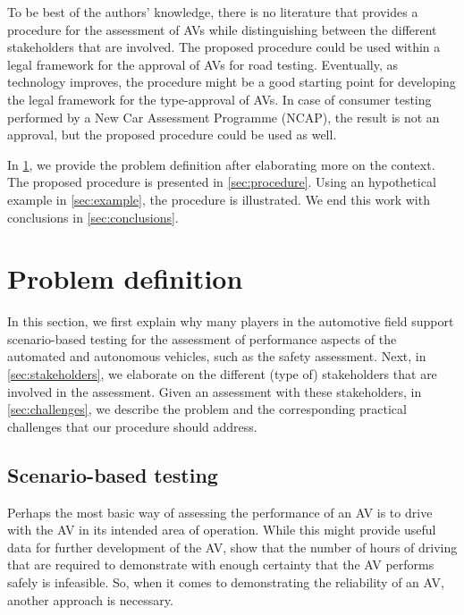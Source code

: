 \documentclass[twoside,twocolumn,9pt]{article}
\theoremstyle{plain}
\theoremstyle{remark}\newtheorem{remarkenv}{Remark}        %
\begin{document}
To be best of the authors' knowledge, there is no literature that provides a procedure for the assessment of AVs while distinguishing between the different stakeholders that are involved. The proposed procedure could be used within a legal framework for the approval of AVs for road testing. 
Eventually, as technology improves, the procedure might be a good starting point for developing the legal framework for the type-approval of AVs.
In case of consumer testing performed by a New Car Assessment Programme (NCAP), the result is not an approval, but the proposed procedure could be used as well. 

In \cref{sec:problem}, we provide the problem definition after elaborating more on the context. The proposed procedure is presented in \cref{sec:procedure}. Using an hypothetical example in \cref{sec:example}, the procedure is illustrated. We end this work with conclusions in \cref{sec:conclusions}.


\section{Problem definition}
\label{sec:problem}

In this section, we first explain why many players in the automotive field support scenario-based testing for the assessment of performance aspects of the automated and autonomous vehicles, such as the safety assessment. Next, in \cref{sec:stakeholders}, we elaborate on the different (type of) stakeholders that are involved in the assessment. Given an assessment with these stakeholders, in \cref{sec:challenges}, we describe the problem and the corresponding practical challenges that our procedure should address.



\subsection{Scenario-based testing}
\label{sec:scenario-based testing}

Perhaps the most basic way of assessing the performance of an AV is to drive with the AV in its intended area of operation. While this might provide useful data for further development of the AV, \textcite{kalra2016driving,wachenfeld2016release} show that the number of hours of driving that are required to demonstrate with enough certainty that the AV performs safely is infeasible. So, when it comes to demonstrating the reliability of an AV, another approach is necessary.
\end{document}
